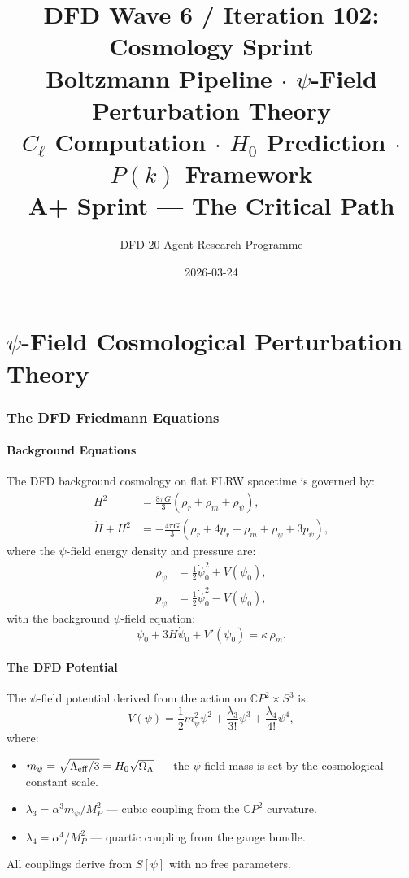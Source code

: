 \documentclass[11pt,a4paper]{article}
\title{DFD Wave 6 / Iteration 102: Cosmology Sprint\\[6pt]
\large Boltzmann Pipeline $\cdot$ $\psi$-Field Perturbation Theory\\
$C_\ell$ Computation $\cdot$ $H_0$ Prediction $\cdot$ $P(k)$ Framework\\[6pt]
\normalsize A+ Sprint --- The Critical Path}
\author{DFD 20-Agent Research Programme}
\date{2026-03-24}
\theoremstyle{remark}
\newcommand{\CP}{\mathbb{C}P}
\begin{document}
\maketitle
\tableofcontents
\newpage

\part{$\psi$-Field Cosmological Perturbation Theory}
\label{part:perturbation}

\section{The DFD Friedmann Equations}

\subsection{Background Equations}

The DFD background cosmology on flat FLRW spacetime is governed by:
\begin{align}
H^2 &= \frac{8\pi G}{3}\left(\rho_r + \rho_m + \rho_\psi\right), \label{eq:friedmann1}\\
\dot{H} + H^2 &= -\frac{4\pi G}{3}\left(\rho_r + 4p_r + \rho_m + \rho_\psi + 3p_\psi\right), \label{eq:friedmann2}
\end{align}
where the $\psi$-field energy density and pressure are:
\begin{align}
\rho_\psi &= \frac{1}{2}\dot\psi_0^2 + V(\psi_0), \label{eq:rho-psi}\\
p_\psi &= \frac{1}{2}\dot\psi_0^2 - V(\psi_0), \label{eq:p-psi}
\end{align}
with the background $\psi$-field equation:
\begin{equation}
\ddot\psi_0 + 3H\dot\psi_0 + V'(\psi_0) = \kappa\,\rho_m.
\label{eq:psi-bg}
\end{equation}

\subsection{The DFD Potential}

The $\psi$-field potential derived from the action on $\CP^2 \times S^3$ is:
\begin{equation}
V(\psi) = \frac{1}{2}m_\psi^2\psi^2 + \frac{\lambda_3}{3!}\psi^3 + \frac{\lambda_4}{4!}\psi^4,
\label{eq:potential}
\end{equation}
where:
\begin{itemize}
\item $m_\psi = \sqrt{\Lambda_{\rm eff}/3} = H_0\sqrt{\Omega_\Lambda}$ --- the $\psi$-field mass is set by the cosmological constant scale.
\item $\lambda_3 = \alpha^3 m_\psi/M_P^2$ --- cubic coupling from the $\CP^2$ curvature.
\item $\lambda_4 = \alpha^4/M_P^2$ --- quartic coupling from the gauge bundle.
\end{itemize}
All couplings derive from $S[\psi]$ with no free parameters.
\end{document}
